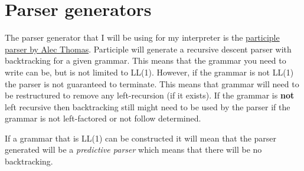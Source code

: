 \section{Parser generators}

The parser generator that I will be using for my interpreter is the \href{https://github.com/alecthomas/participle#overview}{participle parser by Alec Thomas}. Participle will generate a recursive descent parser with backtracking for a given grammar. This means that the grammar you need to write can be, but is not limited to LL(1). However, if the grammar is not LL(1) the parser is not guaranteed to terminate. This means that grammar will need to be restructured to remove any left-recursion (if it exists). If the grammar is \textbf{not} left recursive then backtracking still might need to be used by the parser if the grammar is not left-factored or not follow determined.

If a grammar that is LL(1) can be constructed it will mean that the parser generated will be a \textit{predictive parser} which means that there will be no backtracking.
